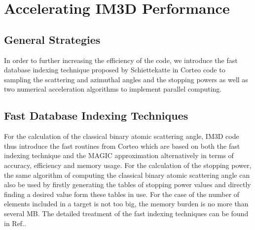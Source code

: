 
\chapter{Accelerating IM3D Performance}  %

\label{Chapter5}  %



\section{General Strategies}

In order to further increasing the efficiency of the code, we introduce the fast database indexing technique proposed by Schiettekatte in Corteo code\cite{Schiettekatte:2008} to sampling the scattering and azimuthal angles and the stopping powers as well as two numerical acceleration algorithms to implement parallel computing.


\section{Fast Database Indexing Techniques}

For the calculation of the classical binary atomic scattering angle, IM3D code thus introduce the fast routines from Corteo which are based on both the fast indexing technique and the MAGIC approximation\cite{Ziegler:2010} alternatively in terms of accuracy, efficiency and memory usage. For the calculation of the stopping power, the same algorithm of computing the classical binary atomic scattering angle can also be used by firstly generating the tables of stopping power values and directly finding a desired value form these tables in use.
For the case of the number of elements included in a target is not too big, the memory burden is no more than several MB. The detailed treatment of the fast indexing techniques can be found in Ref.\cite{Borschel:2011,Schiettekatte:2008}.


